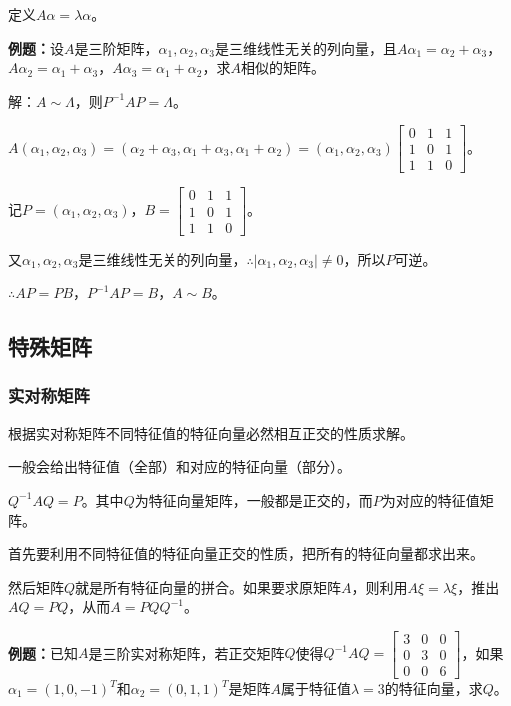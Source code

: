 定义$A\alpha=\lambda\alpha$。

\textbf{例题：}设$A$是三阶矩阵，$\alpha_1,\alpha_2,\alpha_3$是三维线性无关的列向量，且$A\alpha_1=\alpha_2+\alpha_3$，$A\alpha_2=\alpha_1+\alpha_3$，$A\alpha_3=\alpha_1+\alpha_2$，求$A$相似的矩阵。

解：$A\sim\Lambda$，则$P^{-1}AP=\Lambda$。

$A(\alpha_1,\alpha_2,\alpha_3)=(\alpha_2+\alpha_3,\alpha_1+\alpha_3,\alpha_1+\alpha_2)=(\alpha_1,\alpha_2,\alpha_3)\left[\begin{array}{ccc}
    0 & 1 & 1 \\
    1 & 0 & 1 \\
    1 & 1 & 0
\end{array}\right]$。

记$P=(\alpha_1,\alpha_2,\alpha_3)$，$B=\left[\begin{array}{ccc}
    0 & 1 & 1 \\
    1 & 0 & 1 \\
    1 & 1 & 0
\end{array}\right]$。\medskip

又$\alpha_1,\alpha_2,\alpha_3$是三维线性无关的列向量，$\therefore\vert\alpha_1,\alpha_2,\alpha_3\vert\neq0$，所以$P$可逆。

$\therefore AP=PB$，$P^{-1}AP=B$，$A\sim B$。

\subsection{特殊矩阵}

\subsubsection{实对称矩阵}

根据实对称矩阵不同特征值的特征向量必然相互正交的性质求解。

一般会给出特征值（全部）和对应的特征向量（部分）。

$Q^{-1}AQ=P$。其中$Q$为特征向量矩阵，一般都是正交的，而$P$为对应的特征值矩阵。

首先要利用不同特征值的特征向量正交的性质，把所有的特征向量都求出来。

然后矩阵$Q$就是所有特征向量的拼合。如果要求原矩阵$A$，则利用$A\xi=\lambda\xi$，推出$AQ=PQ$，从而$A=PQQ^{-1}$。

\textbf{例题：}已知$A$是三阶实对称矩阵，若正交矩阵$Q$使得$Q^{-1}AQ=\left[\begin{array}{ccc}
    3 & 0 & 0 \\
    0 & 3 & 0 \\
    0 & 0 & 6
\end{array}\right]$，如果$\alpha_1=(1,0,-1)^T$和$\alpha_2=(0,1,1)^T$是矩阵$A$属于特征值$\lambda=3$的特征向量，求$Q$。

